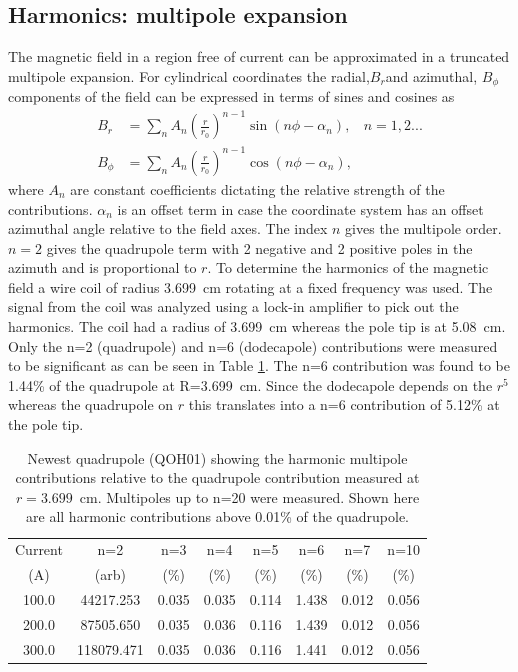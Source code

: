 \documentclass[12pt]{article}
\begin{document}
\subsection{Harmonics: multipole expansion}
The magnetic field in a region free of current can be approximated in a truncated multipole expansion. For cylindrical coordinates the radial,$B_r$and azimuthal, $B_{\phi}$ components of the field can be expressed in terms of sines and cosines as
\begin{align*}
B_r&=\sum_nA_n\left(\frac{r}{r_0}\right)^{n-1}\sin\left(n\phi-\alpha_n\right), ~~~~n=1,2... \\
B_{\phi}&=\sum_nA_n\left(\frac{r}{r_0}\right)^{n-1}\cos\left(n\phi-\alpha_n\right),
\end{align*}
where $A_n$ are constant coefficients dictating the relative strength of the contributions. $\alpha_n$ is an offset term in case the coordinate system has an offset azimuthal angle relative to the field axes. The index $n$ gives the multipole order. $n=2$ gives the quadrupole term with 2 negative and 2 positive poles in the azimuth and is proportional to $r$. To determine the harmonics of the magnetic field a wire coil of radius 3.699~cm rotating at a fixed frequency was used. The signal from the coil was analyzed using a lock-in amplifier to pick out the harmonics. The coil had a radius of 3.699~cm whereas the pole tip is at 5.08~cm. 
Only the n=2 (quadrupole) and n=6 (dodecapole) contributions were measured to be significant as can be seen in Table \ref{tab:q1_harmonics}. The n=6 contribution was found to be 1.44\% of the quadrupole at R=3.699~cm. Since the dodecapole depends on the $r^5$ whereas the quadrupole on $r$ this translates into a n=6 contribution of 5.12\% at the pole tip. 

\begin{table}[!h]
\begin{center}
\caption{\label{tab:q1_harmonics}Newest quadrupole (QOH01) showing the harmonic multipole contributions relative to the quadrupole contribution measured at $r=3.699$~cm. Multipoles up to n=20 were measured. Shown here are all harmonic contributions above 0.01\% of the quadrupole.}
\begin{tabular}{|c|c|c|c|c|c|c|c|}\hline
Current & n=2           &n=3 & n=4 & n=5 & n=6    & n=7  & n=10\\
(A)        & (arb)          &(\%) & (\%)& (\%) & (\%)   & (\%)  & (\%) \\\hline
100.0    &44217.253 &0.035&0.035&0.114&1.438&0.012&0.056\\\hline
200.0    &87505.650 &0.035&0.036&0.116&1.439&0.012&0.056\\\hline
300.0    &118079.471&0.035&0.036&0.116&1.441&0.012&0.056\\\hline
\end{tabular}
\end{center}
\end{table}
\end{document}
